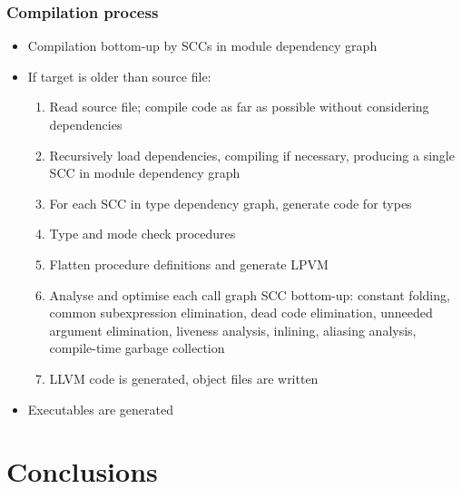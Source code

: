 \documentclass[12pt]{beamer}
\begin{document}
\begin{frame}[fragile]
\frametitle{Compilation process}
\begin{itemize}
\item Compilation bottom-up by SCCs in module dependency graph
\item If target is older than source file:
\begin{enumerate}
\item Read source file; compile code as far as possible without
  considering dependencies
\item Recursively load dependencies, compiling if necessary,
  producing a single SCC in module dependency graph
\item For each SCC in type dependency graph, generate code for types
\item Type and mode check procedures
\item Flatten procedure definitions and generate LPVM
\item Analyse and optimise each call graph SCC bottom-up:
  constant folding,
  common subexpression elimination, dead code elimination, unneeded
  argument elimination, liveness analysis, inlining,
  aliasing analysis, compile-time garbage collection
\item LLVM code is generated, object files are written
\end{enumerate}
\item Executables are generated
\end{itemize}
\end{frame}

\section{Conclusions}
\end{document}
